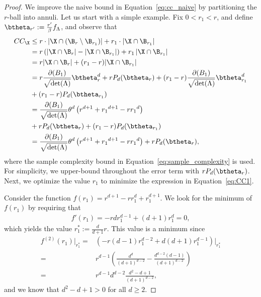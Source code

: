 \begin{proof}
  We improve the naive bound in Equation~\eqref{eq:cc_naive} by partitioning the $r$-ball into annuli. Let us start with a simple example. Fix $0<r_1<
  r$, and define $\btheta_{r'} := \frac{r'}{\beta}f_\Lambda$, and observe that 
\begin{align}
  CC_\X&\leq  r\cdot
\left|\X\cap (\B_{r}\setminus \B_{r_1})\right| + r_1\cdot
\left|\X\cap \B_{r_1}\right|\nonumber \\ & = r\left(|\X\cap \B_{r}|-|\X \cap \B_{r_1}|\right) + r_1 \left|\X\cap \B_{r_1}\right| \nonumber\\
& = r|\X\cap \B_{r}|+ (r_1-r) |\X\cap \B_{r_1}| \nonumber \\  
  & = r\frac{\partial(B_1)}{\sqrt{\det(\Lambda)}}\btheta^d_{r} +r P_d(\btheta_{r}) + (r_1-r) \frac{\partial(B_1)}{\sqrt{\det(\Lambda)}}\btheta^d_{r_1}\nonumber\\& + (r_1-r) P_d(\btheta_{r_1}) \nonumber
\\
& = \frac{\partial(B_1)}{\sqrt{\det(\Lambda)}}\theta^d\left(r^{d+1}+{r_1}^{d+1}-r{r_1}^{d}\right)\nonumber\\&+ r P_d(\btheta_{r}) + (r_1-r) P_d(\btheta_{r_1})\nonumber \\ & = \frac{\partial(B_1)}{\sqrt{\det(\Lambda)}}\theta^d\left(r^{d+1}+{r_1}^{d+1}-r{r_1}^{d}\right)+ r P_d(\btheta_{r}), \label{eq:CC1}
\end{align}
where the sample complexity bound in Equation~\eqref{eq:sample_complexity} is used. For simplicity, we upper-bound throughout the error term with $r P_d(\btheta_{r})$.
Next, we optimize the value $r_1$ to minimize the expression in Equation~\eqref{eq:CC1}.

Consider the function $f(r_1)=r^{d+1}-r r^d_1 + r^{d+1}_1$. We look for the minimum of $f(r_1)$ by requiring that
\begin{align*}
            f'(r_1)=-r dr_1^{d-1}+(d+1)r_1^d=0,
\end{align*}
which yields the value $r^*_1:=\frac{d}{d+1}r$. This value is  a minimum since
\begin{align*}
 f^{(2)}(r_1)|_{r_1^*}=&\left(-r(d-1)r_1^{d-2}+d(d+1)r_1^{d-1}\right)|_{r_1^*}\\
        =&r^{d-1}\left(\frac{d^d}{(d+1)^{d-2}}-\frac{d^{d-2}(d-1)}{(d+1)^{d-2}}\right)\\
        =&r^{d-1}d^{d-2}\frac{d^2-d+1}{(d+1)^{d-2}},
    \end{align*}
    and we know that $d^2-d+1>0$ for all $d\geq 2$.%
    

\end{proof}
